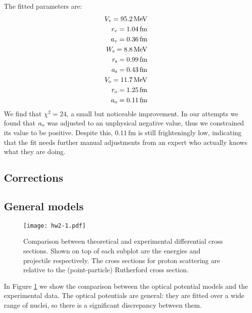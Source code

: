 \documentclass[fleqn, 12pt]{article}
\begin{document}
\begin{enumerate}
  The fitted parameters are:
  \begin{align*}
    V_{\text v} = 95.2\,\mathrm{MeV} \\
    r_{\text v} = 1.04\,\mathrm{fm} \\
    a_{\text v} = 0.36\,\mathrm{fm} \\
    W_{\text s} = 8.8\,\mathrm{MeV} \\
    r_{\text s} = 0.99\,\mathrm{fm} \\
    a_{\text s} = 0.43\,\mathrm{fm} \\
    V_{\text o} = 11.7\,\mathrm{MeV} \\
    r_{\text o} = 1.25\,\mathrm{fm} \\
    a_{\text o} = 0.11\,\mathrm{fm}
  \end{align*}
  We find that $\chi^2 = 24$, a small but noticeable improvement.  In our
  attempts we found that $a_{\text o}$ was adjusted to an unphysical negative
  value, thus we constrained its value to be positive.  Despite this,
  $0.11\,\mathrm{fm}$ is still frighteningly low, indicating that the fit
  needs further manual adjustments from an expert who actually knows what they
  are doing.

\end{enumerate}

\newpage

\subsection*{Corrections}

\subsection*{General models}

\begin{figure}
  \centering
  \texttt{[image: hw2-1.pdf]}
  \caption{Comparison between theoretical and experimental differential
    cross sections.  Shown on top of each subplot are the energies and
    projectile respectively.  The cross sections for proton scattering are
    relative to the (point-particle) Rutherford cross section.}
  \label{fig:compare2}
\end{figure}

In Figure \ref{fig:compare2} we show the comparison between the optical
potential models and the experimental data.  The optical potentials are
general: they are fitted over a wide range of nuclei, so there is a
significant discrepancy between them.
\end{document}
